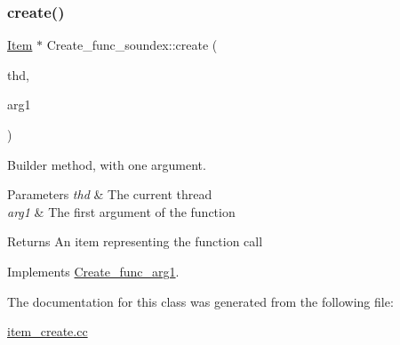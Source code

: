 \subsubsection{\texorpdfstring{create()}{create()}}
{\footnotesize\ttfamily \mbox{\hyperlink{classItem}{Item}} $\ast$ Create\+\_\+func\+\_\+soundex\+::create (\begin{DoxyParamCaption}\item[{T\+HD $\ast$}]{thd,  }\item[{\mbox{\hyperlink{classItem}{Item}} $\ast$}]{arg1 }\end{DoxyParamCaption})\hspace{0.3cm}{\ttfamily [virtual]}}

Builder method, with one argument. 
\begin{DoxyParams}{Parameters}
{\em thd} & The current thread \\
\hline
{\em arg1} & The first argument of the function \\
\hline
\end{DoxyParams}
\begin{DoxyReturn}{Returns}
An item representing the function call 
\end{DoxyReturn}


Implements \mbox{\hyperlink{classCreate__func__arg1_a3e9a98f755cd82c3e762e334c955a8c9}{Create\+\_\+func\+\_\+arg1}}.



The documentation for this class was generated from the following file\+:\begin{DoxyCompactItemize}
\item 
\mbox{\hyperlink{item__create_8cc}{item\+\_\+create.\+cc}}\end{DoxyCompactItemize}
